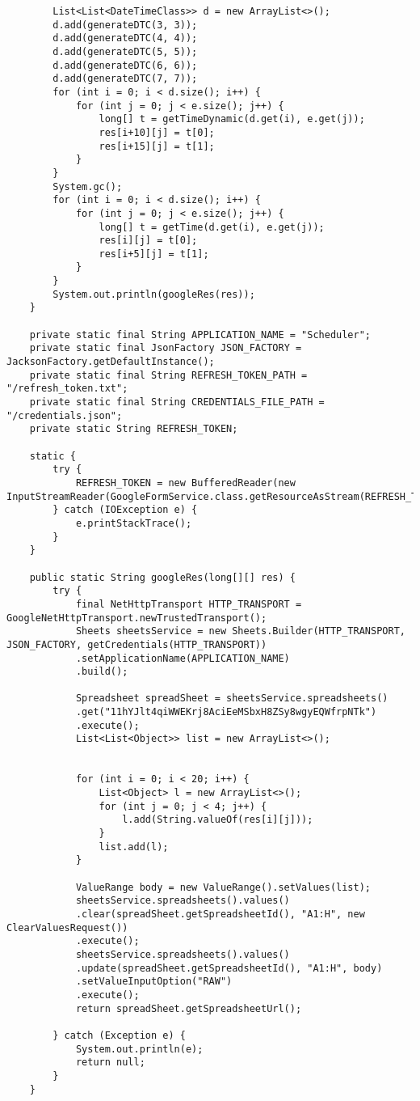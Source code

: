 \begin{lstlisting}
		List<List<DateTimeClass>> d = new ArrayList<>();
		d.add(generateDTC(3, 3));
		d.add(generateDTC(4, 4));
		d.add(generateDTC(5, 5));
		d.add(generateDTC(6, 6));
		d.add(generateDTC(7, 7));
		for (int i = 0; i < d.size(); i++) {
			for (int j = 0; j < e.size(); j++) {
				long[] t = getTimeDynamic(d.get(i), e.get(j));
				res[i+10][j] = t[0];
				res[i+15][j] = t[1];
			}
		}
		System.gc();
		for (int i = 0; i < d.size(); i++) {
			for (int j = 0; j < e.size(); j++) {
				long[] t = getTime(d.get(i), e.get(j));
				res[i][j] = t[0];
				res[i+5][j] = t[1];
			}
		}
		System.out.println(googleRes(res));
	}
	
	private static final String APPLICATION_NAME = "Scheduler";
	private static final JsonFactory JSON_FACTORY = JacksonFactory.getDefaultInstance();
	private static final String REFRESH_TOKEN_PATH = "/refresh_token.txt";
	private static final String CREDENTIALS_FILE_PATH = "/credentials.json";
	private static String REFRESH_TOKEN;
	
	static {
		try {
			REFRESH_TOKEN = new BufferedReader(new InputStreamReader(GoogleFormService.class.getResourceAsStream(REFRESH_TOKEN_PATH))).readLine();
		} catch (IOException e) {
			e.printStackTrace();
		}
	}
	
	public static String googleRes(long[][] res) {
		try {
			final NetHttpTransport HTTP_TRANSPORT = GoogleNetHttpTransport.newTrustedTransport();
			Sheets sheetsService = new Sheets.Builder(HTTP_TRANSPORT, JSON_FACTORY, getCredentials(HTTP_TRANSPORT))
			.setApplicationName(APPLICATION_NAME)
			.build();
			
			Spreadsheet spreadSheet = sheetsService.spreadsheets()
			.get("11hYJlt4qiWWEKrj8AciEeMSbxH8ZSy8wgyEQWfrpNTk")
			.execute();
			List<List<Object>> list = new ArrayList<>();
			
			
			for (int i = 0; i < 20; i++) {
				List<Object> l = new ArrayList<>();
				for (int j = 0; j < 4; j++) {
					l.add(String.valueOf(res[i][j]));
				}
				list.add(l);
			}
			
			ValueRange body = new ValueRange().setValues(list);
			sheetsService.spreadsheets().values()
			.clear(spreadSheet.getSpreadsheetId(), "A1:H", new ClearValuesRequest())
			.execute();
			sheetsService.spreadsheets().values()
			.update(spreadSheet.getSpreadsheetId(), "A1:H", body)
			.setValueInputOption("RAW")
			.execute();
			return spreadSheet.getSpreadsheetUrl();
			
		} catch (Exception e) {
			System.out.println(e);
			return null;
		}
	}
	

\end{lstlisting}
